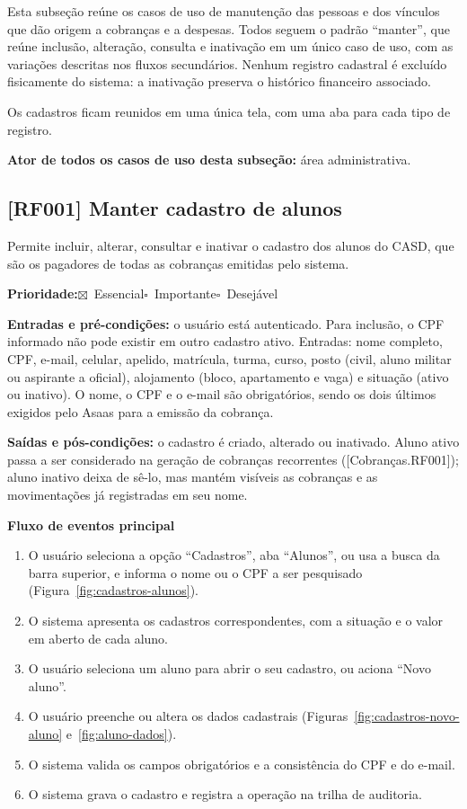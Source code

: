 \documentclass[11pt,a4paper,oneside]{report}
\newcommand{\req}[2]{%
  \subsection*{[#1] #2}%
  \addcontentsline{toc}{subsection}{[#1] #2}}
\newcommand{\marcado}{$\boxtimes$}
\newcommand{\vazio}{$\square$}
\newcommand{\prioE}{\par\textbf{Prioridade:}\quad\marcado~Essencial\quad\vazio~Importante\quad\vazio~Desejável\par}
\newcommand{\entradas}{\textbf{Entradas e pré-condições:} }
\newcommand{\saidas}{\par\textbf{Saídas e pós-condições:} }
\newcommand{\fluxoprincipal}{\par\textbf{Fluxo de eventos principal}\par}
\begin{document}
Esta subseção reúne os casos de uso de manutenção das pessoas e dos vínculos que dão origem a
cobranças e a despesas. Todos seguem o padrão ``manter'', que reúne inclusão, alteração, consulta e
inativação em um único caso de uso, com as variações descritas nos fluxos secundários. Nenhum
registro cadastral é excluído fisicamente do sistema: a inativação preserva o histórico financeiro
associado.

Os cadastros ficam reunidos em uma única tela, com uma aba para cada tipo de registro.

\textbf{Ator de todos os casos de uso desta subseção:} área administrativa.

\req{RF001}{Manter cadastro de alunos}

Permite incluir, alterar, consultar e inativar o cadastro dos alunos do CASD, que são os pagadores
de todas as cobranças emitidas pelo sistema.

\prioE

\entradas o usuário está autenticado. Para inclusão, o CPF informado não pode existir em outro
cadastro ativo. Entradas: nome completo, CPF, e-mail, celular, apelido, matrícula, turma, curso,
posto (civil, aluno militar ou aspirante a oficial), alojamento (bloco, apartamento e vaga) e
situação (ativo ou inativo). O nome, o CPF e o e-mail são obrigatórios, sendo os dois últimos
exigidos pelo Asaas para a emissão da cobrança.

\saidas o cadastro é criado, alterado ou inativado. Aluno ativo passa a ser considerado na geração
de cobranças recorrentes ([Cobranças.RF001]); aluno inativo deixa de sê-lo, mas mantém visíveis as
cobranças e as movimentações já registradas em seu nome.

\fluxoprincipal
\begin{enumerate}
  \item O usuário seleciona a opção ``Cadastros'', aba ``Alunos'', ou usa a busca da barra
        superior, e informa o nome ou o CPF a ser pesquisado (Figura~\ref{fig:cadastros-alunos}).
  \item O sistema apresenta os cadastros correspondentes, com a situação e o valor em aberto de
        cada aluno.
  \item O usuário seleciona um aluno para abrir o seu cadastro, ou aciona ``Novo aluno''.
  \item O usuário preenche ou altera os dados cadastrais (Figuras~\ref{fig:cadastros-novo-aluno}
        e~\ref{fig:aluno-dados}).
  \item O sistema valida os campos obrigatórios e a consistência do CPF e do e-mail.
  \item O sistema grava o cadastro e registra a operação na trilha de auditoria.
\end{enumerate}
\end{document}

